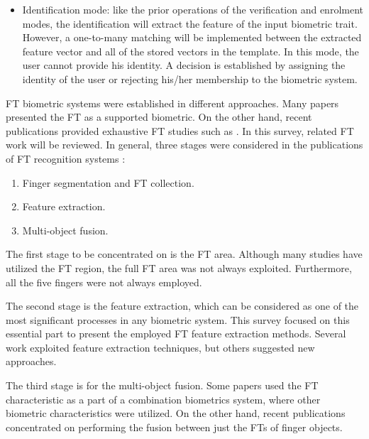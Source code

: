 \documentclass[review]{elsarticle}
\begin{document}
\begin{itemize}
		\item Identification mode: like the prior operations of the verification and enrolment modes, the identification will extract the feature of the input biometric trait. However, a one-to-many matching will be implemented between the extracted feature vector and all of the stored vectors in the template. In this mode, the user cannot provide his identity. A decision is established by assigning the identity of the user or rejecting his/her membership to the biometric system. 
	\end{itemize}
	
	FT biometric systems were established in different approaches. Many papers presented the FT as a supported biometric. On the other hand, recent publications provided exhaustive FT studies such as \cite{Al-Nima2017Robust,Al-Nima2017finger}. In this survey, related FT work will be reviewed. In general, three stages were considered in the publications of FT recognition systems \cite{Al-Nima2017Robust,Al-Nima2017efficient,Al-Nima2017Signal}: 
	\begin{enumerate}
		\item Finger segmentation and FT collection.
		\item Feature extraction.
		\item Multi-object fusion.
	\end{enumerate}

	The first stage to be concentrated on is the FT area. Although many studies have utilized the FT region, the full FT area was not always exploited. Furthermore, all the five fingers were not always employed. 

	The second stage is the feature extraction, which can be considered as one of the most significant processes in any biometric system. This survey focused on this essential part to present the employed FT feature extraction methods. Several work exploited feature extraction techniques, but others suggested new approaches. 

	The third stage is for the multi-object fusion. Some papers used the FT characteristic as a part of a combination biometrics system, where other biometric characteristics were utilized. On the other hand, recent publications concentrated on performing the fusion between just the FTs of finger objects. 
\end{document}

